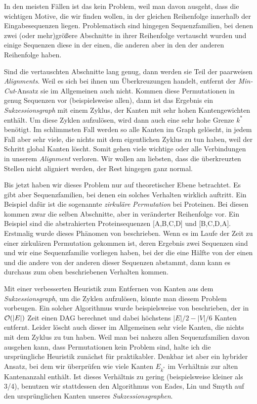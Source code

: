In den meisten Fällen ist das kein Problem, weil man davon ausgeht, dass die wichtigen Motive, die wir finden wollen, in der gleichen Reihenfolge innerhalb der Eingabesequenzen liegen. Problematisch sind hingegen Sequenzfamilien, bei denen zwei (oder mehr)größere Abschnitte in ihrer Reihenfolge vertauscht wurden und einige Sequenzen diese in der einen, die anderen aber in den der anderen Reihenfolge haben. 

Sind die vertauschten Abschnitte lang genug, dann werden sie Teil der paarweisen \emph{Alignments}. Weil es sich bei ihnen um Überkreuzungen handelt, entfernt der \emph{Min-Cut}-Ansatz sie im Allgemeinen auch nicht. Kommen diese Permutationen in genug Sequenzen vor (beispielsweise allen), dann ist das Ergebnis ein \emph{Sukzessionsgraph} mit einem Zyklus, der Kanten mit sehr hohen Kantengewichten enthält. Um diese Zyklen aufzulösen, wird dann auch eine sehr hohe Grenze $k^{*}$ benötigt. Im schlimmsten Fall werden so alle Kanten im Graph gelöscht, in jedem Fall aber sehr viele, die nichts mit dem eigentlichen Zyklus zu tun haben, weil der Schritt global Kanten löscht. Somit gehen viele wichtige oder alle Verbindungen in unserem \emph{Alignment} verloren. Wir wollen am liebsten, dass die überkreuzten Stellen nicht aligniert werden, der Rest hingegen ganz normal.

Bis jetzt haben wir dieses Problem nur auf theoretischer Ebene betrachtet. Es gibt aber Sequenzfamilien, bei denen ein solches Verhalten wirklich auftritt. Ein Beispiel dafür ist die sogenannte \emph{zirkuläre Permutation} bei Proteinen. Bei diesen kommen zwar die selben Abschnitte, aber in veränderter Reihenfolge vor. Ein Beispiel sind die abstrahierten Proteinsequenzen [A,B,C,D] und [B,C,D,A]. Erstmalig wurde dieses Phänomen von \cite{chhe79} beschrieben. Wenn es im Laufe der Zeit zu einer zirkulären Permutation gekommen ist, deren Ergebnis zwei Sequenzen sind und wir eine Sequenzfamilie vorliegen haben, bei der die eine Hälfte von der einen und die andere von der anderen dieser Sequenzen abstammt, dann kann es durchaus zum oben beschriebenen Verhalten kommen.

Mit einer verbesserten Heuristik zum Entfernen von Kanten aus dem \emph{Sukzessionsgraph}, um die Zyklen aufzulösen, könnte man diesem Problem vorbeugen. Ein solcher Algorithmus wurde beispielsweise von \cite{els93} beschrieben, der in $\mathcal{O}(|E|)$ Zeit einen DAG berechnet und dabei höchstens $|E|/2 - |V|/6$ Kanten entfernt. Leider löscht auch dieser im Allgemeinen sehr viele Kanten, die nichts mit dem Zyklus zu tun haben. Weil man bei nahezu allen Sequenzfamilien davon ausgehen kann, dass Permutationen kein Problem sind, halte ich die ursprüngliche Heuristik zunächst für praktikabler. Denkbar ist aber ein hybrider Ansatz, bei dem wir überprüfen wie viele Kanten $E_{k^{*}}$ im Verhältnis zur alten Kantenanzahl enthält. Ist dieses Verhältnis zu gering (beispielsweise kleiner als 3/4), benutzen wir stattdessen den Algorithmus von Eades, Lin und Smyth auf den ursprünglichen Kanten unseres \emph{Sukzessionsgraphen}.

